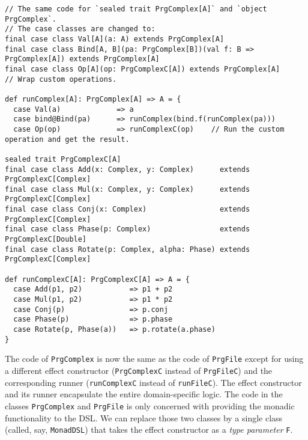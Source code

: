 \begin{lstlisting}
// The same code for `sealed trait PrgComplex[A]` and `object PrgComplex`.
// The case classes are changed to:
final case class Val[A](a: A) extends PrgComplex[A]
final case class Bind[A, B](pa: PrgComplex[B])(val f: B => PrgComplex[A]) extends PrgComplex[A]
final case class Op[A](op: PrgComplexC[A]) extends PrgComplex[A]     // Wrap custom operations.

def runComplex[A]: PrgComplex[A] => A = {
  case Val(a)             => a
  case bind@Bind(pa)      => runComplex(bind.f(runComplex(pa)))
  case Op(op)             => runComplexC(op)    // Run the custom operation and get the result.

sealed trait PrgComplexC[A]
final case class Add(x: Complex, y: Complex)      extends PrgComplexC[Complex]
final case class Mul(x: Complex, y: Complex)      extends PrgComplexC[Complex]
final case class Conj(x: Complex)                 extends PrgComplexC[Complex]
final case class Phase(p: Complex)                extends PrgComplexC[Double]
final case class Rotate(p: Complex, alpha: Phase) extends PrgComplexC[Complex]
 
def runComplexC[A]: PrgComplexC[A] => A = {
  case Add(p1, p2)           => p1 + p2
  case Mul(p1, p2)           => p1 * p2
  case Conj(p)               => p.conj
  case Phase(p)              => p.phase
  case Rotate(p, Phase(a))   => p.rotate(a.phase)
}
\end{lstlisting}
The code of \lstinline!PrgComplex!
is now the same as the code of \lstinline!PrgFile!
except for using a different effect constructor (\lstinline!PrgComplexC!
instead of \lstinline!PrgFileC!)
and the corresponding runner (\lstinline!runComplexC!
instead of \lstinline!runFileC!).
The effect constructor and its runner encapsulate the entire domain-specific
logic. The code in the classes \lstinline!PrgComplex!
and \lstinline!PrgFile!
is only concerned with providing the monadic functionality to the
DSL. We can replace those two classes by a single class (called, say,
\lstinline!MonadDSL!) that
takes the effect constructor as a \emph{type parameter} \lstinline!F!.
